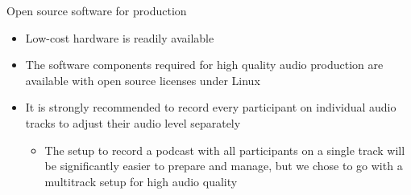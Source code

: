 \begin{frame}{Open source software for production}

    \begin{itemize}
        \item Low-cost hardware is readily available
        \item The software components required for high quality audio production are available with open source licenses under Linux
        \item It is strongly recommended to record every participant on individual audio tracks to adjust their audio level separately
        \begin{itemize}
            \item The setup to record a podcast with all participants on a single track will be significantly easier to prepare and manage, but we chose to go with a multitrack setup for high audio quality
        \end{itemize}
    \end{itemize}
    
\end{frame}

